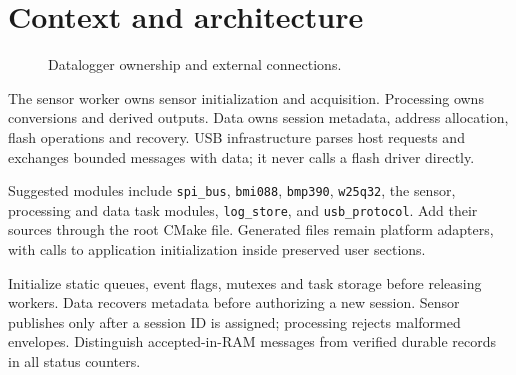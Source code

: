 \section{Context and architecture}
\begin{figure}[htbp]\centering\caption{Datalogger ownership and external connections.}\end{figure}
The sensor worker owns sensor initialization and acquisition. Processing owns conversions and derived outputs. Data owns session metadata, address allocation, flash operations and recovery. USB infrastructure parses host requests and exchanges bounded messages with data; it never calls a flash driver directly.

Suggested modules include \texttt{spi\_bus}, \texttt{bmi088}, \texttt{bmp390}, \texttt{w25q32}, the sensor, processing and data task modules, \texttt{log\_store}, and \texttt{usb\_protocol}. Add their sources through the root CMake file. Generated files remain platform adapters, with calls to application initialization inside preserved user sections.

Initialize static queues, event flags, mutexes and task storage before releasing workers. Data recovers metadata before authorizing a new session. Sensor publishes only after a session ID is assigned; processing rejects malformed envelopes. Distinguish accepted-in-RAM messages from verified durable records in all status counters.
